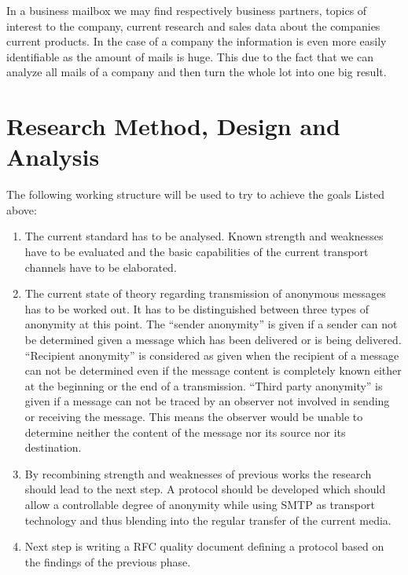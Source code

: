 \documentclass[twocolumn,a4paper,10pt,english]{article}
\begin{document}
In a business mailbox we may find respectively business partners, topics of interest to the company, current research and sales data about the companies current products. In the case of a company the information is even more easily identifiable as the amount of mails is huge. This due to the fact that we can analyze all mails of a company and then turn the whole lot into one big result.\par

\section{Research Method, Design and Analysis}
The following working structure will be used to try to achieve the goals Listed above:\par
\begin{enumerate}
\item The current standard has to be analysed. Known strength and weaknesses have to be evaluated and the basic capabilities of the current transport channels have to be elaborated. \par

\item The current state of theory regarding transmission of anonymous messages has to be worked out. It has to be distinguished between three types of anonymity at this point. The ``sender anonymity'' is given if a sender can not be determined given a message which has been delivered or is being delivered. ``Recipient anonymity'' is considered as given when the recipient of a message can not be determined even if the message content is completely known either at the beginning or the end of a transmission. ``Third party anonymity'' is given if a message can not be traced by an observer not involved in sending or receiving the message. This means the observer would be unable to determine neither the content of the message nor its source nor its destination. \par

\item By recombining strength and weaknesses of previous works the research should lead to the next step. A protocol should be developed which should allow a controllable degree of anonymity while using SMTP as transport technology and thus blending into the regular transfer of the current media. \par

\item Next step is writing a RFC quality document defining a protocol based on the findings of the previous phase. \par


\end{enumerate}
\end{document}
